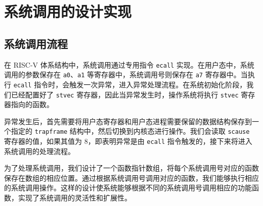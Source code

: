 \documentclass[UTF8]{article}
\begin{document}

\section{系统调用的设计实现}
\subsection{系统调用流程}
在 RISC-V 体系结构中，系统调用通过专用指令 \texttt{ecall} 实现。在用户态中，系统调用的参数保存在 \texttt{a0}、\texttt{a1} 等寄存器中，系统调用号则保存在 \texttt{a7} 寄存器中。当执行 \texttt{ecall} 指令时，会触发一次异常，进入异常处理流程。在系统初始化阶段，我们已经配置好了 \texttt{stvec} 寄存器，因此当异常发生时，操作系统将执行 \texttt{stvec} 寄存器指向的函数。

异常发生后，首先需要将用户态寄存器和用户态进程需要保留的数据结构保存到一个指定的 \texttt{trapframe} 结构中，然后切换到内核态进行操作。我们会读取 \texttt{scause} 寄存器的值，如果其值为 8，即表明异常是由 \texttt{ecall} 指令触发的，接下来将进入系统调用的处理流程。

为了处理系统调用，我们设计了一个函数指针数组，将每个系统调用号对应的函数保存在数组的相应位置。通过根据系统调用号调用对应的函数，我们能够执行相应的系统调用操作。这样的设计使系统能够根据不同的系统调用号调用相应的功能函数，实现了系统调用的灵活性和扩展性。
\end{document}
